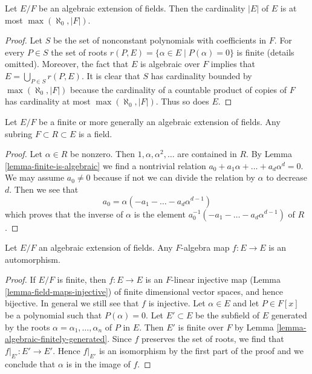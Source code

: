 \begin{lemma}
\label{lemma-size-algebraic-extension}
Let $E/F$ be an algebraic extension of fields. Then the cardinality $|E|$
of $E$ is at most $\max(\aleph_0, |F|)$.
\end{lemma}

\begin{proof}
Let $S$ be the set of nonconstant polynomials with coefficients in $F$.
For every $P \in S$ the set of roots
$r(P, E) = \{\alpha \in E \mid P(\alpha) = 0\}$
is finite (details omitted). Moreover, the fact that $E$ is algebraic
over $F$ implies that $E = \bigcup_{P \in S} r(P, E)$.
It is clear that $S$ has cardinality bounded by $\max(\aleph_0, |F|)$
because the cardinality of a countable product of copies of $F$ has
cardinality at most $\max(\aleph_0, |F|)$.
Thus so does $E$.
\end{proof}

\begin{lemma}
\label{lemma-subalgebra-algebraic-extension-field}
Let $E/F$ be a finite or more generally an algebraic extension of fields.
Any subring $F \subset R \subset E$ is a field.
\end{lemma}

\begin{proof}
Let $\alpha \in R$ be nonzero. Then $1, \alpha, \alpha^2, \ldots$
are contained in $R$. By Lemma \ref{lemma-finite-is-algebraic}
we find a nontrivial relation
$a_0 + a_1 \alpha + \ldots + a_d \alpha^d = 0$.
We may assume $a_0 \not = 0$ because if not we can divide the relation
by $\alpha$ to decrease $d$. Then we see that
$$
a_0 = \alpha (- a_1  - \ldots - a_d \alpha^{d - 1})
$$
which proves that the inverse of $\alpha$ is the element
$a_0^{-1} (- a_1  - \ldots - a_d \alpha^{d - 1})$
of $R$.
\end{proof}

\begin{lemma}
\label{lemma-algebraic-extension-self-map}
Let $E/F$ an algebraic extension of fields. Any $F$-algebra map
$f : E \to E$ is an automorphism.
\end{lemma}

\begin{proof}
If $E/F$ is finite, then $f : E \to E$ is an $F$-linear 
injective map (Lemma \ref{lemma-field-maps-injective})
of finite dimensional vector spaces, and hence bijective.
In general we still see that $f$ is injective.
Let $\alpha \in E$ and let $P \in F[x]$ be a
polynomial such that $P(\alpha) = 0$.
Let $E' \subset E$ be the subfield of $E$ generated
by the roots $\alpha = \alpha_1, \ldots, \alpha_n$ of $P$ in $E$.
Then $E'$ is finite over $F$ by Lemma \ref{lemma-algebraic-finitely-generated}.
Since $f$ preserves the set of roots, we find that
$f|_{E'} : E' \to E'$. Hence $f|_{E'}$ is an isomorphism
by the first part of the proof and we conclude that $\alpha$
is in the image of $f$.
\end{proof}






